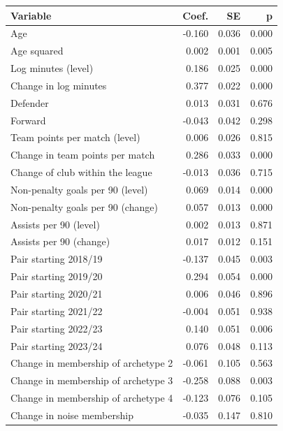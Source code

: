 \begin{tabular}{lrrr}
\toprule
Variable & Coef. & SE & p \\
\midrule
Age & -0.160 & 0.036 & 0.000 \\
Age squared & 0.002 & 0.001 & 0.005 \\
Log minutes (level) & 0.186 & 0.025 & 0.000 \\
Change in log minutes & 0.377 & 0.022 & 0.000 \\
Defender & 0.013 & 0.031 & 0.676 \\
Forward & -0.043 & 0.042 & 0.298 \\
Team points per match (level) & 0.006 & 0.026 & 0.815 \\
Change in team points per match & 0.286 & 0.033 & 0.000 \\
Change of club within the league & -0.013 & 0.036 & 0.715 \\
Non-penalty goals per 90 (level) & 0.069 & 0.014 & 0.000 \\
Non-penalty goals per 90 (change) & 0.057 & 0.013 & 0.000 \\
Assists per 90 (level) & 0.002 & 0.013 & 0.871 \\
Assists per 90 (change) & 0.017 & 0.012 & 0.151 \\
Pair starting 2018/19 & -0.137 & 0.045 & 0.003 \\
Pair starting 2019/20 & 0.294 & 0.054 & 0.000 \\
Pair starting 2020/21 & 0.006 & 0.046 & 0.896 \\
Pair starting 2021/22 & -0.004 & 0.051 & 0.938 \\
Pair starting 2022/23 & 0.140 & 0.051 & 0.006 \\
Pair starting 2023/24 & 0.076 & 0.048 & 0.113 \\
Change in membership of archetype 2 & -0.061 & 0.105 & 0.563 \\
Change in membership of archetype 3 & -0.258 & 0.088 & 0.003 \\
Change in membership of archetype 4 & -0.123 & 0.076 & 0.105 \\
Change in noise membership & -0.035 & 0.147 & 0.810 \\
\bottomrule
\end{tabular}
